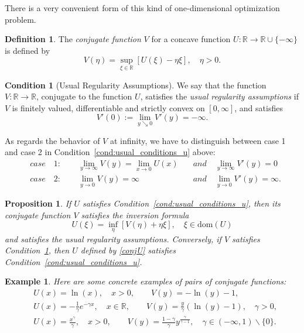 \documentclass[a4paper]{article}
\newtheorem{exa}{Example}[section]
\newtheorem{proposition}[theorem]{Proposition}
\theoremstyle{definition}
\newtheorem{definition}[theorem]{Definition}
\newtheorem{condition}[theorem]{Condition}
\numberwithin{equation}{section}
\begin{document}
There is a very convenient form of this kind of one-dimensional optimization problem.

\begin{definition}
The \emph{conjugate function} $V$ for a concave function $U:\mathbb R\rightarrow\mathbb R\cup\{-\infty\}$ is defined by
\begin{equation}\label{conj1}
V(\eta)=\sup_{\xi\in\mathbb R}[U(\xi)-\eta\xi],\quad \eta>0.
\end{equation}
\end{definition}

\begin{condition}[Usual Regularity Assumptions]\label{cond:usual_assump_v}
We say that the function $V:\mathbb R\rightarrow\mathbb R$, conjugate to the function $U$, satisfies the \emph{usual regularity assumptions} if $V$ is finitely valued, differentiable and strictly convex on $[0,\infty]$, and satisfies
$$V'(0):=\lim_{y\searrow 0}V'(y)=-\infty.$$

As regards the behavior of $V$ at infinity, we have to distinguish between case 1 and case 2 in Condition~\ref{cond:usual_conditions_u} above:
\begin{equation}\nonumber
\begin{aligned}
&case\quad 1:\qquad\lim_{y\rightarrow\infty}V(y)=\lim_{x\rightarrow 0}U(x)\quad &and \quad \lim_{y\rightarrow\infty}V'(y)=0\\
&case\quad 2:\qquad\lim_{y\rightarrow 0}V(y)=\infty\quad &and\quad \lim_{y\rightarrow 0}V'(y)=\infty.
\end{aligned}
\end{equation}
\end{condition}

\begin{proposition}
If $U$ satisfies Condition~\ref{cond:usual_conditions_u}, then its conjugate function $V$ satisfies the inversion formula
\begin{equation}\label{conjU}
U(\xi)=\inf_\eta[V(\eta)+\eta\xi],\quad \xi\in\mathrm{dom}(U)
\end{equation}
and satisfies the usual regularity assumptions. Conversely, if $V$ satisfies Condition~\ref{cond:usual_assump_v}, then $U$ defined by \eqref{conjU} satisfies Condition~\ref{cond:usual_conditions_u}.
\end{proposition}

\begin{exa}
Here are some concrete examples of pairs of conjugate functions:
\begin{equation}\nonumber
\begin{aligned}
&U(x)=\ln(x),\quad x>0,\qquad V(y)=-\ln(y)-1,\\
&U(x)=-\frac{1}{\gamma}e^{-\gamma x},\quad x\in\mathbb R,\qquad V(y)=\frac{y}{\gamma}(\ln(y)-1),\quad\gamma>0,\\
&U(x)=\frac{x^\gamma}{\gamma},\quad x>0,\qquad V(y)=\frac{1-\gamma}{\gamma}y^{\frac{\gamma}{\gamma-1}},\quad\gamma\in(-\infty,1)\backslash\{0\}.
\end{aligned}
\end{equation}
\end{exa}
\end{document}
